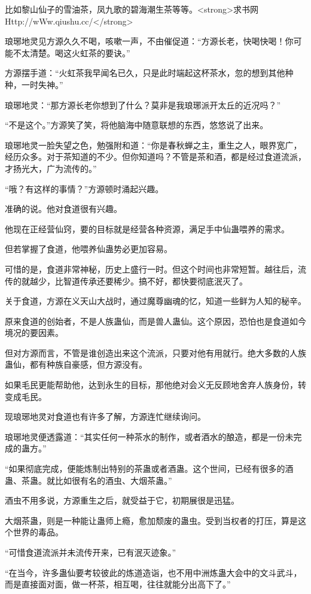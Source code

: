 \begin{this_body}
比如黎山仙子的雪油茶，凤九歌的碧海潮生茶等等。<strong>求书网Http://wWw.qiushu.cc/</strong>

琅琊地灵见方源久久不喝，咳嗽一声，不由催促道：“方源长老，快喝快喝！你可能不太清楚。喝这火虹茶的要诀。”

方源摆手道：“火虹茶我早闻名已久，只是此时端起这杯茶水，忽的想到其他种种，一时失神。”

琅琊地灵：“那方源长老你想到了什么？莫非是我琅琊派开太丘的近况吗？”

“不是这个。”方源笑了笑，将他脑海中随意联想的东西，悠悠说了出来。

琅琊地灵一脸失望之色，勉强附和道：“你是春秋蝉之主，重生之人，眼界宽广，经历众多。对于茶知道的不少。但你知道吗？不管是茶和酒，都是经过食道流派，才扬光大，广为流传的。”

“哦？有这样的事情？”方源顿时涌起兴趣。

准确的说。他对食道很有兴趣。

他现在正经营仙窍，要的目标就是经营各种资源，满足手中仙蛊喂养的需求。

但若掌握了食道，他喂养仙蛊势必更加容易。

可惜的是，食道非常神秘，历史上盛行一时。但这个时间也非常短暂。越往后，流传的就越少，比智道传承还要稀少。搞不好，都快要彻底泯灭了。

关于食道，方源在义天山大战时，通过魔尊幽魂的忆，知道一些鲜为人知的秘辛。

原来食道的创始者，不是人族蛊仙，而是兽人蛊仙。这个原因，恐怕也是食道如今境况的要因素。

但对方源而言，不管是谁创造出来这个流派，只要对他有用就行。绝大多数的人族蛊仙，都有种族自豪感，但方源没有。

如果毛民更能帮助他，达到永生的目标，那他绝对会义无反顾地舍弃人族身份，转变成毛民。

现琅琊地灵对食道也有许多了解，方源连忙继续询问。

琅琊地灵便透露道：“其实任何一种茶水的制作，或者酒水的酿造，都是一份未完成的蛊方。”

“如果彻底完成，便能炼制出特别的茶蛊或者酒蛊。这个世间，已经有很多的酒蛊、茶蛊。就比如很有名的酒虫、大烟茶蛊。”

酒虫不用多说，方源重生之后，就受益于它，初期展很是迅猛。

大烟茶蛊，则是一种能让蛊师上瘾，愈加颓废的蛊虫。受到当权者的打压，算是这个世界的毒品。

“可惜食道流派并未流传开来，已有泯灭迹象。”

“在当今，许多蛊仙要考较彼此的炼道造诣，也不用中洲炼蛊大会中的文斗武斗，而是直接面对面，做一杯茶，相互喝，往往就能分出高下了。”


\end{this_body}

